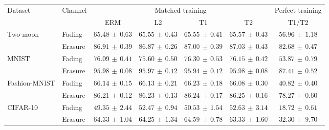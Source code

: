 \begin{tabular*}{\linewidth}{@{\extracolsep{\fill}}llccccc@{}}
\toprule
\multirow{2}{*}{Dataset} & \multirow{2}{*}{Channel} & \multicolumn{4}{c}{Matched training} & Perfect training \\
\cmidrule(lr){3-6}\cmidrule(l){7-7}
 & & ERM & L2 & T1 & T2 & T1/T2 \\
\midrule
\multirow{2}{*}{Two-moon} & Fading & $65.48\,\pm\,0.63$ & $65.55\,\pm\,0.43$ & $65.55\,\pm\,0.41$ & $\mathbf{65.57}\,\pm\,0.43$ & $56.96\,\pm\,1.18$ \\
 & Erasure & $86.91\,\pm\,0.39$ & $86.87\,\pm\,0.26$ & $87.00\,\pm\,0.39$ & $\mathbf{87.03}\,\pm\,0.43$ & $82.68\,\pm\,0.47$ \\
\midrule[0.25pt]
\multirow{2}{*}{MNIST} & Fading & $76.09\,\pm\,0.41$ & $75.60\,\pm\,0.50$ & $\mathbf{76.30}\,\pm\,0.53$ & $76.15\,\pm\,0.42$ & $53.87\,\pm\,0.79$ \\
 & Erasure & $95.98\,\pm\,0.08$ & $95.97\,\pm\,0.12$ & $95.94\,\pm\,0.12$ & $\mathbf{95.98}\,\pm\,0.08$ & $87.41\,\pm\,0.52$ \\
\midrule[0.25pt]
\multirow{2}{*}{Fashion-MNIST} & Fading & $66.14\,\pm\,0.15$ & $66.13\,\pm\,0.21$ & $\mathbf{66.23}\,\pm\,0.18$ & $66.08\,\pm\,0.30$ & $40.82\,\pm\,0.40$ \\
 & Erasure & $86.21\,\pm\,0.12$ & $86.23\,\pm\,0.13$ & $86.24\,\pm\,0.17$ & $\mathbf{86.25}\,\pm\,0.16$ & $78.27\,\pm\,0.60$ \\
\midrule[0.25pt]
\multirow{2}{*}{CIFAR-10} & Fading & $49.35\,\pm\,2.44$ & $52.47\,\pm\,0.94$ & $50.53\,\pm\,1.54$ & $\mathbf{52.63}\,\pm\,3.14$ & $18.72\,\pm\,0.61$ \\
 & Erasure & $64.33\,\pm\,1.04$ & $64.25\,\pm\,1.34$ & $\mathbf{64.59}\,\pm\,0.78$ & $63.33\,\pm\,1.60$ & $32.30\,\pm\,9.70$ \\
\bottomrule
\end{tabular*}
